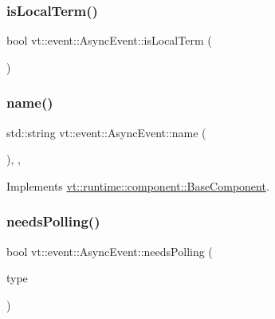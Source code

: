 \subsubsection{\texorpdfstring{is\+Local\+Term()}{isLocalTerm()}}
{\footnotesize\ttfamily bool vt\+::event\+::\+Async\+Event\+::is\+Local\+Term (\begin{DoxyParamCaption}{ }\end{DoxyParamCaption})}

\mbox{\label{structvt_1_1event_1_1_async_event_ac68b97804ca9b3dab1785a3c8a5d8242}} 
\subsubsection{\texorpdfstring{name()}{name()}}
{\footnotesize\ttfamily std\+::string vt\+::event\+::\+Async\+Event\+::name (\begin{DoxyParamCaption}{ }\end{DoxyParamCaption})\hspace{0.3cm}{\ttfamily [inline]}, {\ttfamily [override]}, {\ttfamily [virtual]}}



Implements \hyperlink{structvt_1_1runtime_1_1component_1_1_base_component_a7701485f3539f78d42e6bad47fc7eb78}{vt\+::runtime\+::component\+::\+Base\+Component}.

\mbox{\label{structvt_1_1event_1_1_async_event_a4d6056e47909a858fcd3bfc3782b8d2d}} 
\subsubsection{\texorpdfstring{needs\+Polling()}{needsPolling()}}
{\footnotesize\ttfamily bool vt\+::event\+::\+Async\+Event\+::needs\+Polling (\begin{DoxyParamCaption}\item[{\hyperlink{namespacevt_1_1event_a1ea9fec44d101bf40b8fd786d44ebed9}{Event\+Record\+Type\+Type} const \&}]{type }\end{DoxyParamCaption})}

